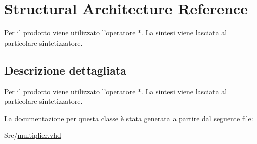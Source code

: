 \hypertarget{classmultiplier_1_1_structural}{\section{Structural Architecture Reference}
\label{classmultiplier_1_1_structural}
}


Per il prodotto viene utilizzato l'operatore $\ast$. La sintesi viene lasciata al particolare sintetizzatore.  




\subsection{Descrizione dettagliata}
Per il prodotto viene utilizzato l'operatore $\ast$. La sintesi viene lasciata al particolare sintetizzatore. 

La documentazione per questa classe è stata generata a partire dal seguente file\+:\begin{DoxyCompactItemize}
\item 
Src/\hyperlink{multiplier_8vhd}{multiplier.\+vhd}\end{DoxyCompactItemize}
